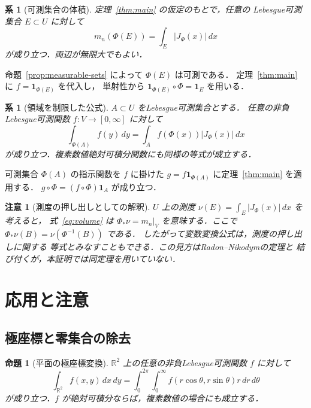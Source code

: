 \documentclass[a5paper,10pt,onecolumn]{jsarticle}
\makeatletter
\theoremstyle{mathnotetheorem}
\newtheorem{proposition}[theorem]{命題}
\newtheorem{corollary}[theorem]{系}
\newtheorem{remark}[theorem]{注意}
\renewcommand{\proofname}{証明}
\renewenvironment{proof}[1][\proofname]{%
  \par\pushQED{\qed}\normalfont\topsep4\p@\@plus2\p@\relax
  \trivlist\item[\hskip\labelsep\bfseries #1]\ignorespaces
}{\popQED\endtrivlist\@endpefalse}
\newcommand{\R}{\mathbb{R}}
\newcommand{\abs}[1]{\lvert #1\rvert}
\makeatother
\begin{document}
\begin{corollary}[可測集合の体積]\label{cor:volume}
定理~\ref{thm:main} の仮定のもとで，任意の
Lebesgue可測集合 $E\subset U$ に対して
\begin{equation}\label{eq:volume}
 m_n(\Phi(E))=\int_E\abs{J_\Phi(x)}\,dx
\end{equation}
が成り立つ．両辺が無限大でもよい．
\end{corollary}

\begin{proof}
命題~\ref{prop:measurable-sets} によって $\Phi(E)$ は可測である．
定理~\ref{thm:main} に $f=\mathbf1_{\Phi(E)}$ を代入し，
単射性から
$\mathbf1_{\Phi(E)}\circ\Phi=\mathbf1_E$ を用いる．
\end{proof}

\begin{corollary}[領域を制限した公式]\label{cor:restricted}
$A\subset U$ をLebesgue可測集合とする．
任意の非負Lebesgue可測関数 $f:V\to[0,\infty]$ に対して
\[
 \int_{\Phi(A)}f(y)\,dy
 =\int_A f(\Phi(x))\abs{J_\Phi(x)}\,dx
\]
が成り立つ．複素数値絶対可積分関数にも同様の等式が成立する．
\end{corollary}

\begin{proof}
可測集合 $\Phi(A)$ の指示関数を $f$ に掛けた
$g=f\mathbf1_{\Phi(A)}$ に定理~\ref{thm:main} を適用する．
$g\circ\Phi=(f\circ\Phi)\mathbf1_A$ が成り立つ．
\end{proof}

\begin{remark}[測度の押し出しとしての解釈]
$U$ 上の測度 $\nu(E)=\int_E\abs{J_\Phi(x)}\,dx$ を考えると，
式~\eqref{eq:volume} は
$\Phi_*\nu=m_n|_V$ を意味する．ここで
$\Phi_*\nu(B)=\nu(\Phi^{-1}(B))$ である．
したがって変数変換公式は，測度の押し出しに関する
等式とみなすこともできる．この見方はRadon--Nikodymの定理と
結び付くが，本証明では同定理を用いていない．
\end{remark}

\section{応用と注意}

\subsection{極座標と零集合の除去}

\begin{proposition}[平面の極座標変換]\label{prop:polar}
$\R^2$ 上の任意の非負Lebesgue可測関数 $f$ に対して
\begin{equation}\label{eq:polar}
 \int_{\R^2}f(x,y)\,dx\,dy
 =\int_0^{2\pi}\int_0^{\infty}
  f(r\cos\theta,r\sin\theta)r\,dr\,d\theta
\end{equation}
が成り立つ．$f$ が絶対可積分ならば，複素数値の場合にも成立する．
\end{proposition}
\end{document}
